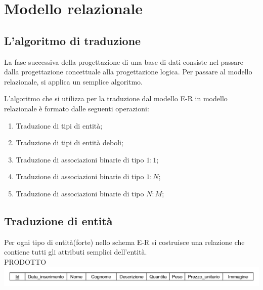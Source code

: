 
\chapter{Modello relazionale}
\label{cap:modello-relazionale}

\section{L'algoritmo di traduzione}
La fase successiva della progettazione di una base di dati consiste nel passare dalla progettazione concettuale alla progettazione logica. Per passare al modello relazionale, si applica un semplice algoritmo.

L'algoritmo che si utilizza per la traduzione dal modello E-R in modello relazionale è formato dalle seguenti operazioni:

\begin{enumerate}
	
	\item
	Traduzione di tipi di entità;
	
	\item
	Traduzione di tipi di entità deboli;
	
	\item
	Traduzione di associazioni binarie di tipo $1:1$;
	
	\item
	Traduzione di associazioni binarie di tipo $1:N$;
	
	\item
	Traduzione di associazioni binarie di tipo $N:M$;

\end{enumerate}

\section{Traduzione di entità}
Per ogni tipo di entità(forte) nello schema E-R si costruisce una relazione che contiene tutti gli attributi semplici dell'entità.\\

PRODOTTO\\
\includegraphics[height=0.04\textheight]{immagini/traduzione_prodotto}

